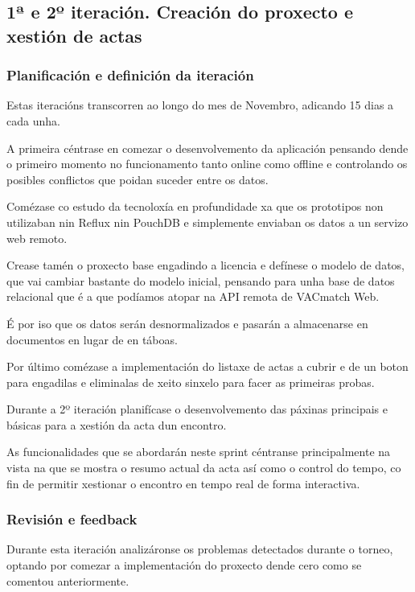     \subsection{1ª e 2º iteración. Creación do proxecto e xestión de actas}

      \subsubsection{Planificación e definición da iteración}
      Estas iteracións transcorren ao longo do mes de Novembro, adicando 15 
dias a cada unha.

      A primeira céntrase en comezar o desenvolvemento da 
aplicación pensando dende o primeiro momento no funcionamento tanto online 
como offline e controlando os posibles conflictos que poidan suceder entre os 
datos.

      Comézase co estudo da tecnoloxía en profundidade xa que os 
prototipos non utilizaban nin Reflux nin PouchDB e simplemente enviaban os 
datos a un servizo web remoto.

      Crease tamén o proxecto base engadindo a licencia e defínese o modelo de 
datos, que vai cambiar bastante do modelo inicial, pensando para unha base de 
datos relacional que é a que podíamos atopar na API remota de VACmatch Web.

      É por iso que os datos serán desnormalizados e pasarán a almacenarse en 
documentos en lugar de en táboas.

      Por último comézase a implementación do listaxe de actas a cubrir e de un 
boton para engadilas e eliminalas de xeito sinxelo para facer as primeiras 
probas.

        Durante a 2º iteración planifícase o desenvolvemento das páxinas 
principais e básicas para a xestión da acta dun encontro.

      As funcionalidades que se abordarán neste sprint céntranse principalmente 
na vista na que se mostra o resumo actual da acta así como o control do tempo, 
co fin de permitir xestionar o encontro en tempo real de forma interactiva.

      \subsubsection{Revisión e feedback}
      Durante esta iteración analizáronse os problemas detectados durante o 
torneo, optando por comezar a implementación do proxecto dende cero como se 
comentou anteriormente.

